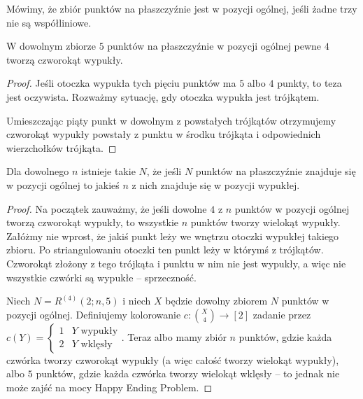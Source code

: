 \begin{definition}
	Mówimy, że zbiór punktów na płaszczyźnie jest w pozycji ogólnej, jeśli żadne trzy nie są współliniowe.
\end{definition}

\begin{theorem}
	W dowolnym zbiorze $5$ punktów na płaszczyźnie w pozycji ogólnej pewne $4$ tworzą czworokąt wypukły.
\end{theorem}
\begin{proof}
	Jeśli otoczka wypukła tych pięciu punktów ma $5$ albo $4$ punkty, to teza jest oczywista. Rozważmy sytuację, gdy otoczka wypukła jest trójkątem.
	\begin{center}
	\end{center}
	Umieszczając piąty punkt w dowolnym z powstałych trójkątów otrzymujemy czworokąt wypukły powstały z punktu w środku trójkąta i odpowiednich wierzchołków trójkąta.
\end{proof}

\begin{theorem}
	Dla dowolnego $n$ istnieje takie $N$, że jeśli $N$ punktów na płaszczyźnie znajduje się w pozycji ogólnej to jakieś $n$ z nich znajduje się w pozycji wypukłej.
\end{theorem}

\begin{proof}
	Na początek zauważmy, że jeśli dowolne $4$ z $n$ punktów w pozycji ogólnej tworzą czworokąt wypukły, to wszystkie $n$ punktów tworzy wielokąt wypukły. Załóżmy nie wprost, że jakiś punkt leży we wnętrzu otoczki wypukłej takiego zbioru. Po striangulowaniu otoczki ten punkt leży w którymś z trójkątów. Czworokąt złożony z tego trójkąta i punktu w nim nie jest wypukły, a więc nie wszystkie czwórki są wypukłe -- sprzeczność.

	Niech $N = R^{(4)}(2;n,5)$ i niech $X$ będzie dowolny zbiorem $N$ punktów w pozycji ogólnej. Definiujemy kolorowanie $c:\binom{X}{4}\to [2]$ zadanie przez $c(Y) = \left\{\begin{array}{lr}
			1 & Y \text{ wypukły} \\
			2 & Y \text{ wklęsły}
		\end{array}\right.$.
	Teraz albo mamy zbiór $n$ punktów, gdzie każda czwórka tworzy czworokąt wypukły (a więc całość tworzy wielokąt wypukły), albo $5$ punktów, gdzie każda czwórka tworzy wielokąt wklęsły -- to jednak nie może zajść na mocy Happy Ending Problem.
\end{proof}

